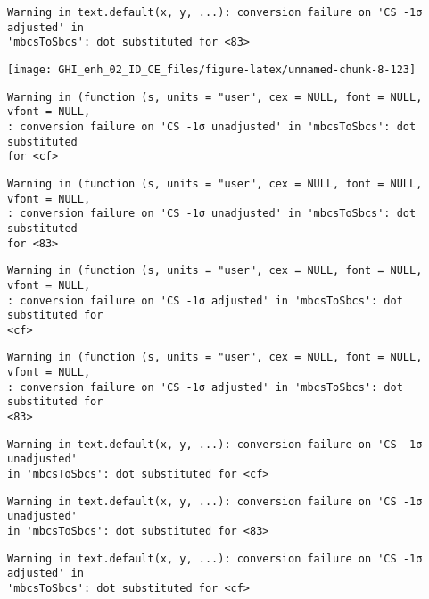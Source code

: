 \documentclass[
  10pt,
  a4paper,oneside]{article}
\begin{document}
\begin{verbatim}
Warning in text.default(x, y, ...): conversion failure on 'CS -1σ adjusted' in
'mbcsToSbcs': dot substituted for <83>
\end{verbatim}

\begin{center}\texttt{[image: GHI\_enh\_02\_ID\_CE\_files/figure-latex/unnamed-chunk-8-123]} \end{center}

\begin{verbatim}
Warning in (function (s, units = "user", cex = NULL, font = NULL, vfont = NULL,
: conversion failure on 'CS -1σ unadjusted' in 'mbcsToSbcs': dot substituted
for <cf>
\end{verbatim}

\begin{verbatim}
Warning in (function (s, units = "user", cex = NULL, font = NULL, vfont = NULL,
: conversion failure on 'CS -1σ unadjusted' in 'mbcsToSbcs': dot substituted
for <83>
\end{verbatim}

\begin{verbatim}
Warning in (function (s, units = "user", cex = NULL, font = NULL, vfont = NULL,
: conversion failure on 'CS -1σ adjusted' in 'mbcsToSbcs': dot substituted for
<cf>
\end{verbatim}

\begin{verbatim}
Warning in (function (s, units = "user", cex = NULL, font = NULL, vfont = NULL,
: conversion failure on 'CS -1σ adjusted' in 'mbcsToSbcs': dot substituted for
<83>
\end{verbatim}

\begin{verbatim}
Warning in text.default(x, y, ...): conversion failure on 'CS -1σ unadjusted'
in 'mbcsToSbcs': dot substituted for <cf>
\end{verbatim}

\begin{verbatim}
Warning in text.default(x, y, ...): conversion failure on 'CS -1σ unadjusted'
in 'mbcsToSbcs': dot substituted for <83>
\end{verbatim}

\begin{verbatim}
Warning in text.default(x, y, ...): conversion failure on 'CS -1σ adjusted' in
'mbcsToSbcs': dot substituted for <cf>
\end{verbatim}
\end{document}
